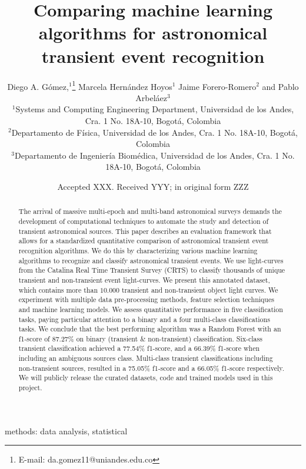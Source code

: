 \documentclass[a4paper,fleqn,usenatbib]{mnras}
\title[Comparing machine learning algorithms for astronomical transient event recognition]{Comparing machine learning algorithms for astronomical transient event recognition}
\author[Diego. A. G\'omez et al.]{
Diego A. G\'omez,$^{1}$\thanks{E-mail: da.gomez11@uniandes.edu.co}
Marcela Hern\'andez Hoyos$^{1}$   
Jaime Forero-Romero$^{2}$
and Pablo Arbel\'aez$^{3}$
\\
$^{1}$Systems and Computing Engineering Department, Universidad de los Andes, Cra. 1 No. 18A-10, Bogot\'a, Colombia\\
$^{2}$Departamento de F\'isica, Universidad de los Andes, Cra. 1 No. 18A-10, Bogot\'a, Colombia\\
$^{3}$Departamento de Ingenier\'ia Biom\'edica, Universidad de los Andes, Cra. 1 No. 18A-10, Bogot\'a, Colombia
}
\date{Accepted XXX. Received YYY; in original form ZZZ}
\begin{document}
\label{firstpage}
\pagerange{\pageref{firstpage}--\pageref{lastpage}}
\maketitle

\begin{abstract}




The arrival of massive multi-epoch and multi-band astronomical surveys
demands the development of computational techniques to automate the
study and detection of transient astronomical sources. 
This paper describes an evaluation framework that allows for a standardized quantitative comparison of astronomical transient event recognition algorithms. 
We do this by characterizing various machine learning algorithms to
recognize and classify astronomical transient events.
We use light-curves from the Catalina Real Time Transient Survey
(CRTS) to classify thousands of unique transient and non-transient
event light-curves.
We present this annotated dataset, which contains more than $10.000$ transient and non-transient object light curves.
We experiment with multiple data pre-processing methods,
feature selection techniques and machine learning models. 
We assess quantitative performance in five classification tasks, paying particular
attention to a binary and a four multi-class classifications tasks.  
We conclude that the best performing algorithm was
a Random Forest with an f1-score of 87.27\% on binary
(transient \& non-transient) classification. 
Six-class transient classification achieved a 77.54\% f1-score, and a 
66.39\% f1-score when including an ambiguous sources class.
Multi-class transient classifications including non-transient sources,
resulted in a 75.05\% f1-score and a 66.05\% f1-score respectively.
We will publicly release the curated datasets, code and trained models used in this project.

\end{abstract}

\begin{keywords}
methods: data analysis, statistical
\end{keywords}
\end{document}
